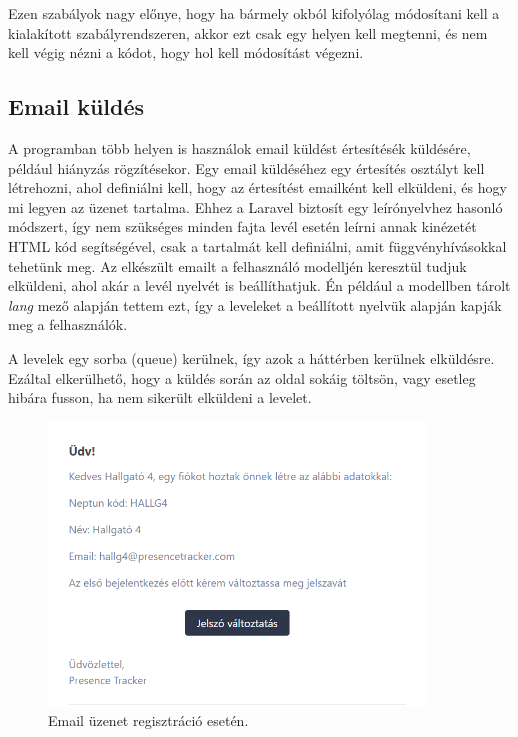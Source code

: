 \documentclass[
]{thesis-ekf}
\theoremstyle{definition}
\theoremstyle{remark}
\begin{document}




Ezen szabályok nagy előnye, hogy ha bármely okból kifolyólag módosítani kell a kialakított szabályrendszeren, akkor ezt csak egy helyen kell megtenni, és nem kell végig nézni a kódot, hogy hol kell módosítást végezni.

\subsection{Email küldés}

A programban több helyen is használok email küldést értesítésék küldésére, például hiányzás rögzítésekor. Egy email küldéséhez egy értesítés osztályt kell létrehozni, ahol definiálni kell, hogy az értesítést emailként kell elküldeni, és hogy mi legyen az üzenet tartalma. Ehhez a Laravel biztosít egy leírónyelvhez hasonló módszert, így nem szükséges minden fajta levél esetén leírni annak kinézetét HTML kód segítségével, csak a tartalmát kell definiálni, amit függvényhívásokkal tehetünk meg.\cite{mail} Az elkészült emailt a felhasználó modelljén keresztül tudjuk elküldeni, ahol akár a levél nyelvét is beállíthatjuk. Én például a modellben tárolt \emph{lang} mező alapján tettem ezt, így a leveleket a beállított nyelvük alapján kapják meg a felhasználók.



A levelek egy sorba (queue) kerülnek, így azok a háttérben kerülnek elküldésre. Ezáltal elkerülhető, hogy a küldés során az oldal sokáig töltsön, vagy esetleg hibára fusson, ha nem sikerült elküldeni a levelet.

\begin{figure}[ht!]
	\centering
	\includegraphics[width=10cm]{../pictures/screenshots/email.png}
	\caption{Email üzenet regisztráció esetén.}
	\label{emailExample}
\end{figure}
\end{document}
